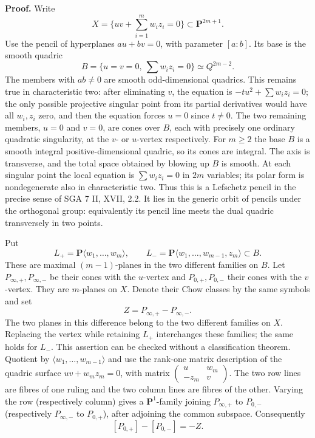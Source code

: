 \documentclass[11pt,a4paper]{article}
\begin{document}
\textbf{Proof.}
Write
\[
 X=\{uv+\textstyle\sum_{i=1}^{m} w_i z_i=0\}
       \subset\mathbf P^{2m+1}.
\]
Use the pencil of hyperplanes $a u+b v=0$, with parameter $[a:b]$.
Its base is the smooth quadric
\[
 B=\{u=v=0,\ \textstyle\sum w_i z_i=0\}\simeq Q^{2m-2}.
\]
The members with $ab\ne0$ are smooth odd-dimensional quadrics. This remains
true in characteristic two: after eliminating $v$, the equation is
$-t u^2+\sum w_i z_i=0$; the only possible projective singular point
from its partial derivatives would have all $w_i,z_i$ zero, and then
the equation forces $u=0$ since $t\ne0$. The two
remaining members, $u=0$ and $v=0$, are cones over $B$, each with precisely
one ordinary quadratic singularity, at the $v$- or $u$-vertex respectively.
For $m\geq2$ the base $B$ is a smooth integral positive-dimensional quadric,
so its cones are integral. The axis is transverse, and the total space
obtained by blowing up $B$ is smooth. At each singular point the local
equation is $\sum w_i z_i=0$ in $2m$ variables; its polar form is
nondegenerate also in characteristic two. Thus this is a Lefschetz pencil in
the precise sense of SGA 7 II, XVII, 2.2. It lies in the generic orbit of
pencils under the orthogonal group: equivalently its pencil line meets the
dual quadric transversely in two points.

Put
\[
 L_+=\mathbf P\langle w_1,\ldots,w_m\rangle,\qquad
 L_-=\mathbf P\langle w_1,\ldots,w_{m-1},z_m\rangle
       \subset B.
\]
These are maximal $(m-1)$-planes in the two different families on $B$.
Let $P_{\infty,+},P_{\infty,-}$ be their cones with the $u$-vertex and
$P_{0,+},P_{0,-}$ their cones with the $v$-vertex. They are $m$-planes on
$X$. Denote their Chow classes by the same symbols and set
\[
 Z=P_{\infty,+}-P_{\infty,-}.
\]
The two planes in this difference belong to the two different families on
$X$. Replacing the vertex while retaining $L_+$ interchanges these families;
the same holds for $L_-$. This assertion can be checked without a
classification theorem. Quotient by
$\langle w_1,\ldots,w_{m-1}\rangle$ and use the rank-one matrix description
of the quadric surface $uv+w_mz_m=0$, with matrix
$\left(\begin{smallmatrix}u&w_m\\-z_m&v\end{smallmatrix}\right)$.
The two row lines are fibres of one ruling and the two column lines are
fibres of the other. Varying the row (respectively column) gives a
$\mathbf P^1$-family joining $P_{\infty,+}$ to $P_{0,-}$ (respectively
$P_{\infty,-}$ to $P_{0,+}$), after adjoining the common subspace.
Consequently
\[
 [P_{0,+}]-[P_{0,-}]=-Z.
\]
\end{document}
